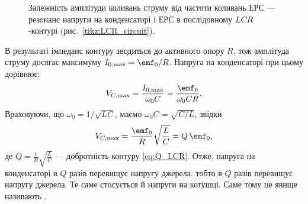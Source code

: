 \begin{figure}
	\centering
{}
	\caption{Залежність амплітуди коливань струму від частоти коливань ЕРС --- резонанс напруги на конденсаторі і ЕРС в послідовному $LCR$-контурі (рис.~\ref{tikz:LCR_circuit}).}
	\label{tikz:current_resonance}
\end{figure}

В результаті імпеданс контуру зводиться до активного опору $R$, тож амплітуда струму досягає максимуму $I_{0,\max} = \emf_0/R$. Напруга на конденсаторі при цьому дорівнює:
\begin{equation*}
	V_{C,\max} = \frac{I_{0,\max}}{\omega_0 C} = \frac{\emf_0}{\omega_0 C R}.
\end{equation*}
Враховуючи, що $\omega_0 = 1/\sqrt{LC}$, маємо $\omega_0 C = \sqrt{C/L}$, звідки
\begin{equation*}
	V_{C,\max} = \frac{\emf_0}{R}\sqrt{\frac{L}{C}} = Q\,\emf_0,
\end{equation*}
де $Q = \frac{1}{R}\sqrt{\frac{L}{C}}$ --- добротність контуру \eqref{eq:Q_LCR}. Отже, напруга на конденсаторі в $Q$ разів перевищує напругу джерела.
тобто в $Q$ разів перевищує напругу джерела. Те саме стосується й напруги на котушці. Саме тому це явище називають .

